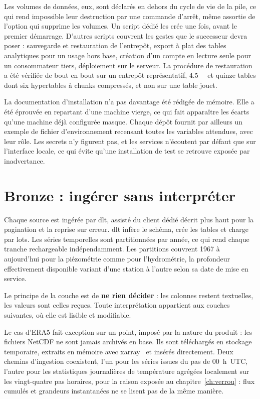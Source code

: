 Les volumes de données, eux, sont déclarés en dehors du cycle de vie de la pile, ce qui rend
impossible leur destruction par une commande d'arrêt, même assortie de l'option qui supprime les
volumes. Un script dédié les crée une fois, avant le premier démarrage. D'autres scripts
couvrent les gestes que le successeur devra poser : sauvegarde et restauration de l'entrepôt,
export à plat des tables analytiques pour un usage hors base, création d'un compte en lecture
seule pour un consommateur tiers, déploiement sur le serveur. La procédure de restauration a été
vérifiée de bout en bout sur un entrepôt représentatif, \SI{4,5}{\giga\byte} et quinze tables
dont six hypertables à chunks compressés, et non sur une table jouet.

La documentation d'installation n'a pas davantage été rédigée de mémoire. Elle a été éprouvée en
repartant d'une machine vierge, ce qui fait apparaître les écarts qu'une machine déjà configurée
masque. Chaque dépôt fournit par ailleurs un exemple de
fichier d'environnement recensant toutes les variables attendues, avec leur rôle. Les secrets
n'y figurent pas, et les services n'écoutent par défaut que sur l'interface locale, ce qui évite
qu'une installation de test se retrouve exposée par inadvertance.

\section{Bronze : ingérer sans interpréter}

Chaque source est ingérée par dlt, assisté du client dédié décrit plus haut pour la pagination
et la reprise sur erreur. dlt infère le schéma, crée les tables et charge par lots. Les séries temporelles sont partitionnées par année, ce qui rend chaque tranche
rechargeable indépendamment. Les partitions couvrent 1967 à aujourd'hui pour la piézométrie
comme pour l'hydrométrie, la profondeur effectivement disponible variant d'une station à
l'autre selon sa date de mise en service.

Le principe de la couche est de \textbf{ne rien décider} : les colonnes restent textuelles,
les valeurs sont celles reçues. Toute interprétation appartient aux couches suivantes, où elle
est lisible et modifiable.

Le cas d'ERA5 fait exception sur un point, imposé par la nature du produit : les fichiers
NetCDF ne sont jamais archivés en base. Ils sont téléchargés en stockage temporaire, extraits en
mémoire avec xarray~\cite{xarray} et insérés directement. Deux chemins d'ingestion coexistent, l'un pour
les séries issues du pas de 00~h~UTC, l'autre pour les statistiques journalières de
température agrégées localement sur les vingt-quatre pas horaires, pour la raison exposée au
chapitre~\ref{ch:verrou} : flux cumulés et grandeurs instantanées ne se lisent pas de la même
manière.

